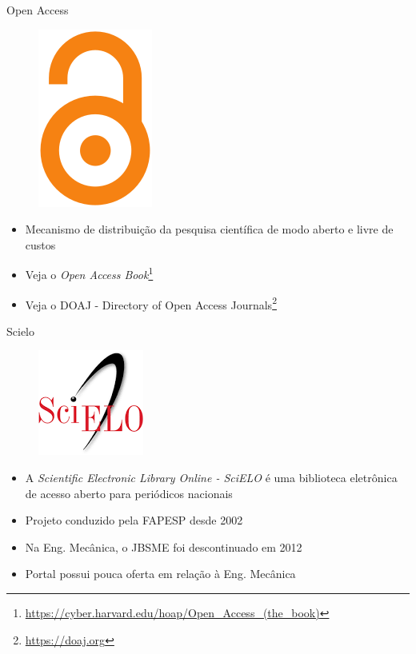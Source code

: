\begin{frame}{Open Access}
\begin{figure}
\includegraphics[scale=0.3]{figs/04/oa}
\end{figure}
\begin{itemize}
\item Mecanismo de distribuição da pesquisa científica de modo aberto e livre de custos
\item Veja o \emph{Open Access Book}\footnote{\url{https://cyber.harvard.edu/hoap/Open_Access_(the_book)}}
\item Veja o DOAJ - Directory of Open Access Journals\footnote{\url{https://doaj.org}}
\end{itemize}
\end{frame}

\begin{frame}{Scielo}
\begin{figure}
\includegraphics[scale=0.4]{figs/04/scielo}
\end{figure}
\begin{itemize}
\item A \emph{Scientific Electronic Library Online - SciELO} é uma biblioteca eletrônica de acesso aberto para periódicos nacionais
\item Projeto conduzido pela FAPESP desde 2002
\item Na Eng. Mecânica, o JBSME foi descontinuado em 2012
\item Portal possui pouca oferta em relação à Eng. Mecânica 
\end{itemize}
\end{frame}


